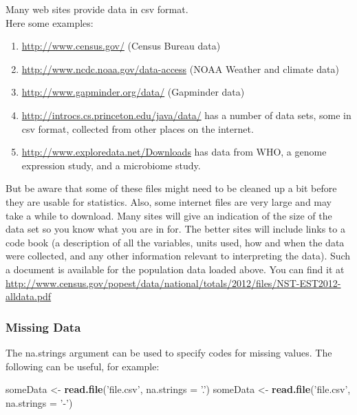 \documentclass[]{book}
\newenvironment{Shaded}{\begin{snugshade}}{\end{snugshade}}
\newcommand{\DataTypeTok}[1]{\textcolor[rgb]{0.13,0.29,0.53}{#1}}
\newcommand{\KeywordTok}[1]{\textcolor[rgb]{0.13,0.29,0.53}{\textbf{#1}}}
\newcommand{\NormalTok}[1]{#1}
\newcommand{\StringTok}[1]{\textcolor[rgb]{0.31,0.60,0.02}{#1}}
\providecommand{\tightlist}{%
  \setlength{\itemsep}{0pt}\setlength{\parskip}{0pt}}
\begin{document}
Many web sites provide data in csv format.\\
Here some examples:

\begin{enumerate}
\tightlist
\item
  \url{http://www.census.gov/} (Census Bureau data)
\item
  \url{http://www.ncdc.noaa.gov/data-access} (NOAA Weather and climate data)
\item
  \url{http://www.gapminder.org/data/} (Gapminder data)
\item
  \url{http://introcs.cs.princeton.edu/java/data/} has a number of data sets, some in csv format, collected from other places on the internet.
\item
  \url{http://www.exploredata.net/Downloads} has data from WHO, a genome expression study, and a microbiome study.
\end{enumerate}

But be aware that some of these files might need to be cleaned up a bit before
they are usable for statistics. Also, some internet files are very large and
may take a while to download. Many sites will give an indication of the size
of the data set so you know what you are in for. The better sites will
include links to a code book (a description of all the variables, units used,
how and when the data were collected, and any other information relevant to
interpreting the data). Such a document is available for the population data
loaded above. You can find it at
\url{http://www.census.gov/popest/data/national/totals/2012/files/NST-EST2012-alldata.pdf}

\hypertarget{missing-data}{%
\subsubsection{Missing Data}\label{missing-data}}

The {na.strings} argument can be used to specify codes for missing values. The following can be useful, for example:

\begin{Shaded}
\begin{Highlighting}[]
\NormalTok{someData <-}\StringTok{ }\KeywordTok{read.file}\NormalTok{(}\StringTok{'file.csv'}\NormalTok{, }\DataTypeTok{na.strings =} \StringTok{'.'}\NormalTok{)}
\NormalTok{someData <-}\StringTok{ }\KeywordTok{read.file}\NormalTok{(}\StringTok{'file.csv'}\NormalTok{, }\DataTypeTok{na.strings =} \StringTok{'-'}\NormalTok{)}
\end{Highlighting}
\end{Shaded}
\end{document}
